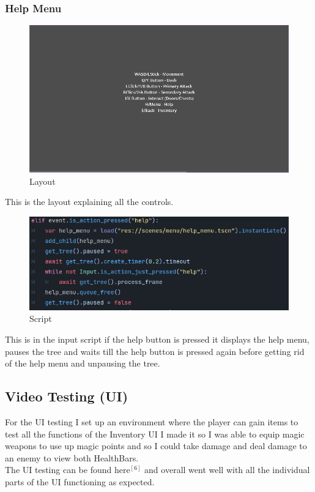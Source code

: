 \documentclass{article}
\begin{document}
        \subsubsection{Help Menu}
        \begin{figure}[H]
                \centering
                \includegraphics[width = 0.8\columnwidth]{images/development/HelpMenu_layout.PNG}
                \caption{Layout}
        \end{figure}
        This is the layout explaining all the controls.\\
        \begin{figure}[H]
                \centering
                \includegraphics[width = 0.8\columnwidth]{images/development/HelpMenu_script.PNG}
                \caption{Script}
        \end{figure}
        This is in the input script if the help button is pressed it displays the help menu, pauses the tree and waits till the help button is pressed again before getting rid of the help menu and unpausing the tree.\\
        \subsection{Video Testing (UI)}
        For the UI testing I set up an environment where the player can gain items to test all the functions of the Inventory UI I made it so I was able to equip magic weapons to use up magic points and so I could take damage and deal damage to an enemy to view both HealthBars.\\
        The UI testing can be found here$^{[6]}$ and overall went well with all the individual parts of the UI functioning as expected.\\
\end{document}
